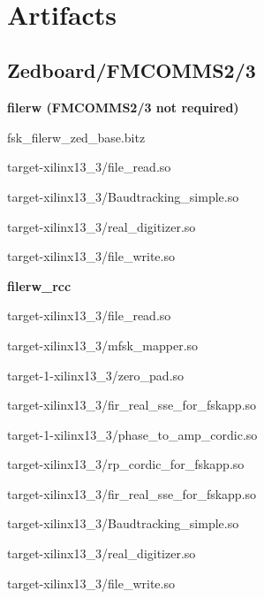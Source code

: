 \begin{appendices}
~\pagebreak
\section{Artifacts}
\label{app:Artifacts}
\subsection{Zedboard/FMCOMMS2/3}
	\textbf{filerw (FMCOMMS2/3 not required)}
	\begin{itemize}
	\begin{minipage}[t]{.5\textwidth}
	\item fsk\_filerw\_zed\_base.bitz
	\item target-xilinx13\_3/file\_read.so
	\item target-xilinx13\_3/Baudtracking\_simple.so
	\end{minipage}
	\begin{minipage}[t]{.5\textwidth}
	\item target-xilinx13\_3/real\_digitizer.so
	\item target-xilinx13\_3/file\_write.so
	\end{minipage}
	\end{itemize}

	\textbf{filerw\_rcc}
	\begin{itemize}
	\begin{minipage}[t]{.5\textwidth}
	\item target-xilinx13\_3/file\_read.so
	\item target-xilinx13\_3/mfsk\_mapper.so
	\item target-1-xilinx13\_3/zero\_pad.so
	\item target-xilinx13\_3/fir\_real\_sse\_for\_fskapp.so
	\item target-1-xilinx13\_3/phase\_to\_amp\_cordic.so
	\end{minipage}
	\begin{minipage}[t]{.5\textwidth}
	\item target-xilinx13\_3/rp\_cordic\_for\_fskapp.so
	\item target-xilinx13\_3/fir\_real\_sse\_for\_fskapp.so
	\item target-xilinx13\_3/Baudtracking\_simple.so
	\item target-xilinx13\_3/real\_digitizer.so
	\item target-xilinx13\_3/file\_write.so
	\end{minipage}
	\end{itemize}


\end{appendices}
